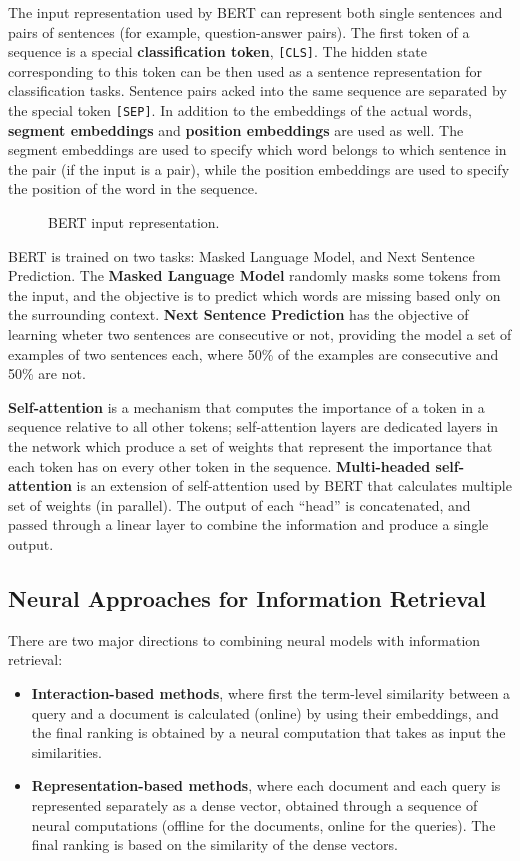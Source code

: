 The input representation used by BERT can represent both single sentences and pairs of sentences (for example, question-answer pairs). The first token of a sequence is a special \textbf{classification token}, \texttt{[CLS]}. The hidden state corresponding to this token can be then used as a sentence representation for classification tasks. Sentence pairs acked into the same sequence are separated by the special token \texttt{[SEP]}. In addition to the embeddings of the actual words, \textbf{segment embeddings} and \textbf{position embeddings} are used as well. The segment embeddings are used to specify which word belongs to which sentence in the pair (if the input is a pair), while the position embeddings are used to specify the position of the word in the sequence.
\begin{figure}[h]
    \vspace{10pt}
    \centering
    
    \caption{BERT input representation.}
\end{figure}

BERT is trained on two tasks: Masked Language Model, and Next Sentence Prediction. The \textbf{Masked Language Model} randomly masks some tokens from the input, and the objective is to predict which words are missing based only on the surrounding context. \textbf{Next Sentence Prediction} has the objective of learning wheter two sentences are consecutive or not, providing the model a set of examples of two sentences each, where 50\% of the examples are consecutive and 50\% are not.

\textbf{Self-attention} is a mechanism that computes the importance of a token in a sequence relative to all other tokens; self-attention layers are dedicated layers in the network which produce a set of weights that represent the importance that each token has on every other token in the sequence. \textbf{Multi-headed self-attention} is an extension of self-attention used by BERT that calculates multiple set of weights (in parallel). The output of each ``head'' is concatenated, and passed through a linear layer to combine the information and produce a single output.

\subsection{Neural Approaches for Information Retrieval}

There are two major directions to combining neural models with information retrieval:
\begin{itemize}
    \item \textbf{Interaction-based methods}, where first the term-level similarity between a query and a document is calculated (online) by using their embeddings, and the final ranking is obtained by a neural computation that takes as input the similarities. 
    \item \textbf{Representation-based methods}, where each document and each query is represented separately as a dense vector, obtained through a sequence of neural computations (offline for the documents, online for the queries). The final ranking is based on the similarity of the dense vectors.
\end{itemize}

